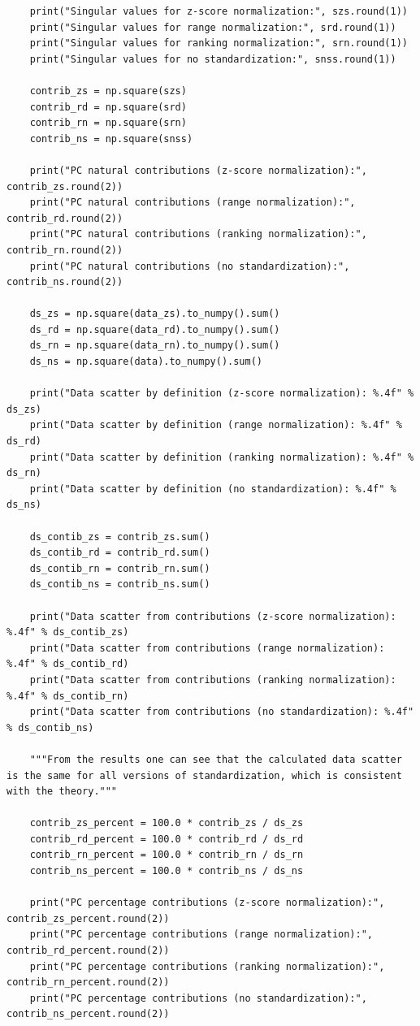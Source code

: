 \documentclass[12pt,a4paper]{article}
\begin{document}
\begin{lstlisting}
	print("Singular values for z-score normalization:", szs.round(1))
	print("Singular values for range normalization:", srd.round(1))
	print("Singular values for ranking normalization:", srn.round(1))
	print("Singular values for no standardization:", snss.round(1))
	
	contrib_zs = np.square(szs)
	contrib_rd = np.square(srd)
	contrib_rn = np.square(srn)
	contrib_ns = np.square(snss)
	
	print("PC natural contributions (z-score normalization):", contrib_zs.round(2))
	print("PC natural contributions (range normalization):", contrib_rd.round(2))
	print("PC natural contributions (ranking normalization):", contrib_rn.round(2))
	print("PC natural contributions (no standardization):", contrib_ns.round(2))
	
	ds_zs = np.square(data_zs).to_numpy().sum()
	ds_rd = np.square(data_rd).to_numpy().sum()
	ds_rn = np.square(data_rn).to_numpy().sum()
	ds_ns = np.square(data).to_numpy().sum()
	
	print("Data scatter by definition (z-score normalization): %.4f" % ds_zs)
	print("Data scatter by definition (range normalization): %.4f" % ds_rd)
	print("Data scatter by definition (ranking normalization): %.4f" % ds_rn)
	print("Data scatter by definition (no standardization): %.4f" % ds_ns)
	
	ds_contib_zs = contrib_zs.sum()
	ds_contib_rd = contrib_rd.sum()
	ds_contib_rn = contrib_rn.sum()
	ds_contib_ns = contrib_ns.sum()
	
	print("Data scatter from contributions (z-score normalization): %.4f" % ds_contib_zs)
	print("Data scatter from contributions (range normalization): %.4f" % ds_contib_rd)
	print("Data scatter from contributions (ranking normalization): %.4f" % ds_contib_rn)
	print("Data scatter from contributions (no standardization): %.4f" % ds_contib_ns)
	
	"""From the results one can see that the calculated data scatter is the same for all versions of standardization, which is consistent with the theory."""
	
	contrib_zs_percent = 100.0 * contrib_zs / ds_zs
	contrib_rd_percent = 100.0 * contrib_rd / ds_rd
	contrib_rn_percent = 100.0 * contrib_rn / ds_rn
	contrib_ns_percent = 100.0 * contrib_ns / ds_ns
	
	print("PC percentage contributions (z-score normalization):", contrib_zs_percent.round(2))
	print("PC percentage contributions (range normalization):", contrib_rd_percent.round(2))
	print("PC percentage contributions (ranking normalization):", contrib_rn_percent.round(2))
	print("PC percentage contributions (no standardization):", contrib_ns_percent.round(2))
	

\end{lstlisting}
\end{document}
